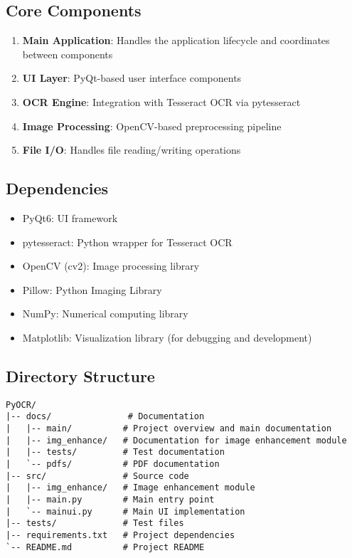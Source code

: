\documentclass[12pt]{article}
\begin{document}
\subsection{Core Components}
\begin{enumerate}
    \item \textbf{Main Application}: Handles the application lifecycle and coordinates between components
    \item \textbf{UI Layer}: PyQt-based user interface components
    \item \textbf{OCR Engine}: Integration with Tesseract OCR via pytesseract
    \item \textbf{Image Processing}: OpenCV-based preprocessing pipeline
    \item \textbf{File I/O}: Handles file reading/writing operations
\end{enumerate}

\subsection{Dependencies}
\begin{itemize}
    \item PyQt6: UI framework
    \item pytesseract: Python wrapper for Tesseract OCR
    \item OpenCV (cv2): Image processing library
    \item Pillow: Python Imaging Library
    \item NumPy: Numerical computing library
    \item Matplotlib: Visualization library (for debugging and development)
\end{itemize}

\subsection{Directory Structure}
\begin{lstlisting}
PyOCR/
|-- docs/               # Documentation
|   |-- main/          # Project overview and main documentation
|   |-- img_enhance/   # Documentation for image enhancement module
|   |-- tests/         # Test documentation
|   `-- pdfs/          # PDF documentation
|-- src/               # Source code
|   |-- img_enhance/   # Image enhancement module
|   |-- main.py        # Main entry point
|   `-- mainui.py      # Main UI implementation
|-- tests/             # Test files
|-- requirements.txt   # Project dependencies
`-- README.md          # Project README
\end{lstlisting}
\end{document}
